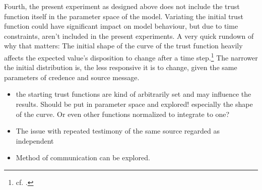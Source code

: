 \documentclass[11pt, a4paper]{scrartcl}
\begin{document}
Fourth, the present experiment as designed above does not include the trust function itself in the parameter space of the model. Variating the initial trust function could have significant impact on model behaviour, but due to time constraints, aren't included in the present experiments. A very quick rundown of why that matters: The initial shape of the curve of the trust function heavily affects the expected value's disposition to change after a time step.\footnote{cf. \textcite{Angere2010}.} The narrower the initial distribution is, the less responsive it is to change, given the same parameters of credence and source message.

\begin{itemize}


    \item the starting trust functions are kind of arbitrarily set and may influence the results. Should be put in parameter space and explored! especially the shape of the curve. Or even other functions normalized to integrate to one?
    \item The issue with repeated testimony of the same source regarded as independent
    \item Method of communication can be explored.
\end{itemize}

\printbibliography{}
\end{document}
